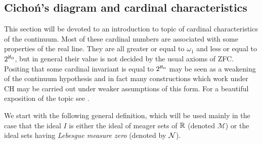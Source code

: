 \newcommand{\M}{\mbox{${\mathcal M}$}}
\newcommand{\A}{\mbox{${\mathcal A}$}}
\newcommand{\U}{\mbox{${\mathcal U}$}}

\subsection{Cicho\'n's diagram and cardinal characteristics}

This section will be devoted to an introduction to topic of cardinal characteristics of the continuum. Most of
these cardinal numbers are associated with some properties of the real line. They are all greater or equal
to $\omega_1$ and less or equal to ${2^{\aleph_0}}$, but in general their value is not decided by the usual axioms of ZFC.
Positing that some cardinal invariant is equal to ${2^{\aleph_0}}$ may be seen as a weakening of the continuum hypothesis
and in fact many constructions which work under CH may be carried out under weaker assumptions of this form.
For a beautiful exposition of the topic see \cite{Bl:2009}.

We start with the following general definition, which will be used mainly in the case that the ideal
$I$ is either the ideal of meager sets of $\mathbb R$ (denoted $\M$) or the ideal sets having \emph{Lebesgue measure zero}
(denoted by ${{\mathcal N}}$).

